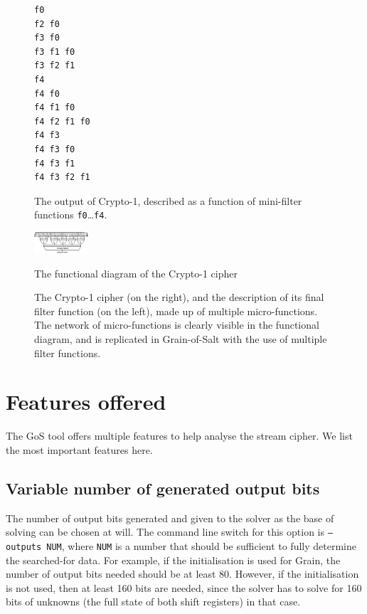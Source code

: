 \documentclass{llncs}
\begin{document}
\begin{figure}[tb]
\centering
\begin{subfloat}
\begin{minipage}{1.7in}
\small
\begin{Verbatim}[frame=lines]
f0
f2 f0
f3 f0
f3 f1 f0
f3 f2 f1
f4
f4 f0
f4 f1 f0
f4 f2 f1 f0
f4 f3
f4 f3 f0
f4 f3 f1
f4 f3 f2 f1
\end{Verbatim}
\end{minipage}
\caption{The output of Crypto-1, described as a function of mini-filter functions \texttt{f0}\ldots \texttt{f4}.}
\label{fig:mini-filters}
\end{subfloat}
\qquad
\begin{subfloat}
\begin{minipage}{2.4in}
\centering
\includegraphics[angle=90, width=2cm]{crypto1_2.pdf}
\end{minipage}
\caption{The functional diagram of the Crypto-1 cipher}
\label{fig:crypto1-diagram}
\end{subfloat}
\caption{The Crypto-1 cipher (on the right), and the description of its final filter function (on the left), made up of multiple micro-functions. The network of micro-functions is clearly visible in the functional diagram, and is replicated in Grain-of-Salt with the use of multiple filter functions.
}
\label{fig:crypto-1}
\end{figure}



\section{Features offered}
\label{sect:gos-features}
The GoS tool offers multiple features to help analyse the stream cipher. We list the most important features here.

\subsection{Variable number of generated output bits}
The number of output bits generated and given to the solver as the base of solving can be chosen at will. The command line switch for this option is \texttt{--outputs NUM}, where \texttt{NUM} is a number that should be sufficient to fully determine the searched-for data. For example, if the initialisation is used for Grain, the number of output bits needed should be at least 80. However, if the initialisation is not used, then at least 160 bits are needed, since the solver has to solve for 160 bits of unknowns (the full state of both shift registers) in that case.
\end{document}
